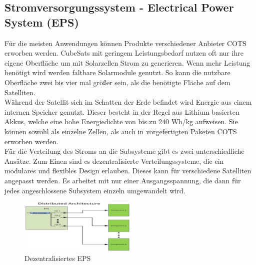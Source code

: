 		\subsection{Stromversorgungssystem - Electrical Power System (EPS)}%
Für die meisten Anwendungen können Produkte verschiedener Anbieter COTS erworben werden. CubeSats mit geringem Leistungsbedarf nutzen oft nur ihre eigene Oberfläche um mit Solarzellen Strom zu generieren. Wenn mehr Leistung benötigt wird werden faltbare Solarmodule genutzt. So kann die nutzbare Oberfläche zwei bis vier mal größer sein, als die benötigte Fläche auf dem Satelliten.\cite{Lettau.}\\
Während der Satellit sich im Schatten der Erde befindet wird Energie aus einem internen Speicher genutzt. Dieser besteht in der Regel aus Lithium basierten Akkus, welche eine hohe Energiedichte von bis zu 240 Wh/kg aufweisen. Sie können sowohl als einzelne Zellen, als auch in vorgefertigten Paketen COTS erworben werden.\cite{Lettau., Abaker.2017}\\
	Für die Verteilung des Stroms an die Subsysteme gibt es zwei unterschiedliche Ansätze. Zum Einen sind es dezentralisierte Verteilungssysteme, die ein modulares und flexibles Design erlauben. Dieses kann für verschiedene Satelliten angepasst werden. Es arbeitet mit nur einer Ausgangsspannung, die dann für jedes angeschlossene Subsystem einzeln umgewandelt wird.\\
\begin{figure}[!h]
	\centering
		\includegraphics[width=0.50\textwidth]{./graphics/Distributed_EPS.PNG}
	\caption{Dezentralisiertes EPS \cite{Abaker.2017}}
\end{figure}

